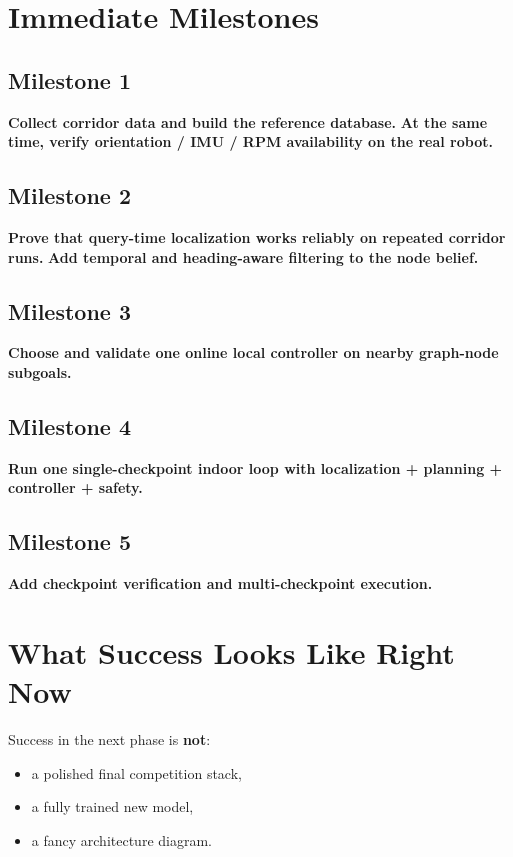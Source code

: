 \documentclass[11pt,a4paper]{article}
\begin{document}
\section{Immediate Milestones}

\subsection*{Milestone 1}

\textbf{Collect corridor data and build the reference database.}
\textbf{At the same time, verify orientation / IMU / RPM availability on the real robot.}

\subsection*{Milestone 2}

\textbf{Prove that query-time localization works reliably on repeated corridor runs.}
\textbf{Add temporal and heading-aware filtering to the node belief.}

\subsection*{Milestone 3}

\textbf{Choose and validate one online local controller on nearby graph-node subgoals.}

\subsection*{Milestone 4}

\textbf{Run one single-checkpoint indoor loop with localization + planning + controller + safety.}

\subsection*{Milestone 5}

\textbf{Add checkpoint verification and multi-checkpoint execution.}


\section{What Success Looks Like Right Now}

Success in the next phase is \textbf{not}:

\begin{itemize}[nosep]
  \item a polished final competition stack,
  \item a fully trained new model,
  \item a fancy architecture diagram.
\end{itemize}
\end{document}
